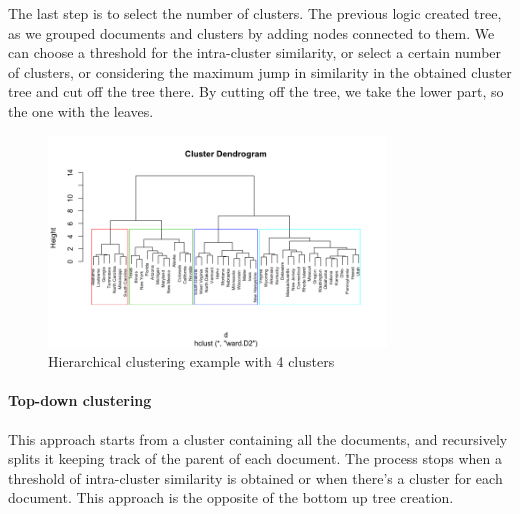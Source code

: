 The last step is to select the number of clusters.
The previous logic created tree, as we grouped documents and clusters by adding 
nodes connected to them.
We can choose a threshold for the intra-cluster similarity, or select a certain 
number of clusters, or considering the maximum jump in similarity in the obtained cluster
tree and cut off the tree there. By cutting off the tree, we take the lower part, so 
the one with the leaves.

\begin{figure}[h]
    \centering
    \includegraphics[width=0.8\textwidth]{images/hierarchical-clustering.png}
    \caption{Hierarchical clustering example with 4 clusters}
\end{figure}

\paragraph{Top-down clustering}
This approach starts from a cluster containing all the documents, and
recursively splits it keeping track of the parent of each document. 
The process stops when a threshold of intra-cluster similarity is obtained 
or when there's a cluster for each document.
This approach is the opposite of the bottom up tree creation.
